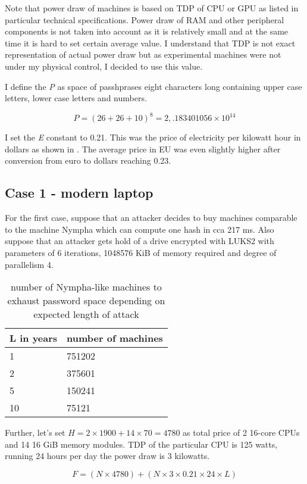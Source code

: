 \documentclass[nolof]{fithesis3}
\begin{document}
Note that power draw of machines is based on TDP of CPU or GPU as listed in particular technical specifications. Power draw of RAM and other peripheral components is not taken into account as it is relatively small and at the same time it is hard to set certain average value. I understand that TDP is not exact representation of actual power draw but as experimental machines were not under my physical control, I decided to use this value.

I define the \emph{P} as space of passhprases eight characters long containing upper case letters, lower case letters and numbers.

$$P = (26 + 26 + 10)^8 = 2,.183401056 \times 10^{14}$$

I set the \emph{E} constant to 0.21. This was the price of electricity per kilowatt hour in dollars as shown in \parencite{electricity}. The average price in EU was even slightly higher after conversion from euro to dollars reaching 0.23.

\subsection{Case 1 - modern laptop}
For the first case, suppose that an attacker decides to buy machines comparable to the machine Nympha which can compute one hash in cca 217 ms. Also suppose that an attacker gets hold of a drive encrypted with LUKS2 with parameters of 6 iterations, 1048576 KiB of memory required and degree of parallelism 4.

\noindent
\begin{table}
\caption{number of Nympha-like machines to exhaust password space depending on expected length of attack}
\label{tab:at1}
\begin{tabularx}{\textwidth}{| X | X |}
\hline
L in years & number of machines\\
\hline
1 & 751202\\
\hline
2 & 375601\\
\hline
5 & 150241\\
\hline
10 & 75121\\
\hline
\end{tabularx}
\end{table}

Further, let's set $H = 2 \times 1900 + 14 \times 70 = 4780$ as total price of 2 16-core CPUs and 14 16 GiB memory modules. TDP of the particular CPU is 125 watts, running 24 hours per day the power draw is 3 kilowatts.

$$F = ( N \times 4780 ) + ( N \times 3 \times 0.21 \times 24 \times L)$$
\end{document}
